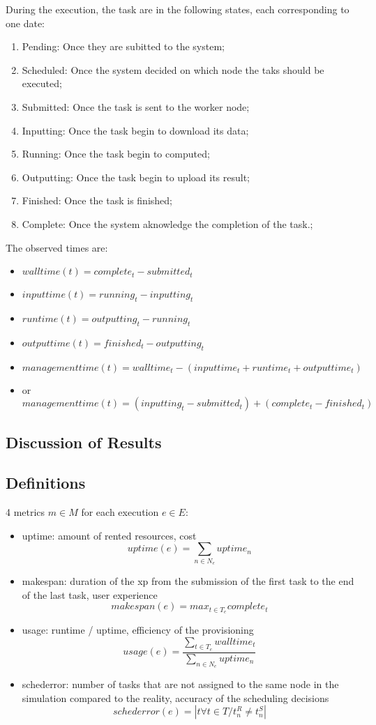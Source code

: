 During the execution, the task are in the following states, each corresponding to one date:
\begin{enumerate}
 \item Pending: Once they are subitted to the system;
 \item Scheduled: Once the system decided on which node the taks should be executed;
 \item Submitted: Once the task is sent to the worker node;
 \item Inputting: Once the task begin to download its data;
 \item Running: Once the task begin to computed;
 \item Outputting: Once the task begin to upload its result;
 \item Finished: Once the task is finished;
 \item Complete: Once the system aknowledge the completion of the task.;
\end{enumerate}

The observed times are:
\begin{itemize}
 \item $walltime(t) = complete_t - submitted_t$ 
 \item $inputtime(t) = running_t - inputting_t$
 \item $runtime(t) = outputting_t - running_t$
 \item $outputtime(t) = finished_t - outputting_t$
 \item $managementtime(t) = walltime_t - (inputtime_t+runtime_t+outputtime_t)$
 \item or $managementtime(t) = (inputting_t - submitted_t) + (complete_t - finished_t)$
\end{itemize}



\subsection{Discussion of Results}

\subsection{Definitions}
4 metrics $m \in M$ for each execution $e \in E$:
\begin{itemize}
 \item uptime: amount of rented resources, cost 
  $$uptime(e) = \sum_{n \in N_e} uptime_n$$
 \item makespan: duration of the xp from the submission of the first task to 
the end of the last task, user experience 
  $$makespan(e) = max_{t \in T_e} complete_t$$
 \item usage: runtime / uptime, efficiency of the provisioning 
  $$usage(e) = \frac{\sum_{t \in T_e} walltime_t}{\sum_{n \in N_e} uptime_n}$$
 \item schederror: number of tasks that are not assigned to the same node in 
the simulation compared to the reality, accuracy of the scheduling decisions
  $$schederror(e) = |t \forall t \in T / t_n^R \neq t_n^S|$$

\end{itemize}

